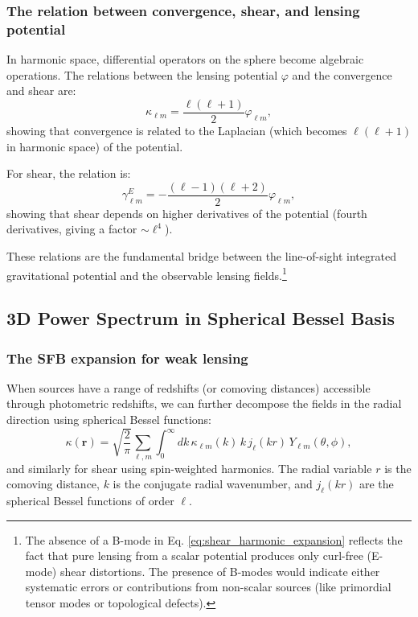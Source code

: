 \subsubsection{The relation between convergence, shear, and lensing potential}

In harmonic space, differential operators on the sphere become algebraic operations. The relations between the lensing potential
$\varphi$ and the convergence and shear are:
\begin{equation}
\kappa_{\ell m} = \frac{\ell(\ell+1)}{2} \varphi_{\ell m},
\label{eq:convergence_potential_relation}
\end{equation}
showing that convergence is related to the Laplacian (which becomes $\ell(\ell+1)$ in harmonic space) of the potential.

For shear, the relation is:
\begin{equation}
\gamma^E_{\ell m} = -\frac{(\ell-1)(\ell+2)}{2} \varphi_{\ell m},
\label{eq:shear_potential_relation}
\end{equation}
showing that shear depends on higher derivatives of the potential (fourth derivatives, giving a factor $\sim \ell^4$).

These relations are the fundamental bridge between the line-of-sight integrated gravitational potential and the observable
lensing fields.\footnote{The absence of a B-mode in Eq. \ref{eq:shear_harmonic_expansion} reflects the fact that pure lensing
from a scalar potential produces only curl-free (E-mode) shear distortions. The presence of B-modes would indicate either
systematic errors or contributions from non-scalar sources (like primordial tensor modes or topological defects).}

\subsection{3D Power Spectrum in Spherical Bessel Basis}

\subsubsection{The SFB expansion for weak lensing}

When sources have a range of redshifts (or comoving distances) accessible through photometric redshifts, we can further decompose
the fields in the radial direction using spherical Bessel functions:
\begin{equation}
\kappa(\mathbf{r}) = \sqrt{\frac{2}{\pi}} \sum_{\ell,m} \int_0^\infty dk \, \kappa_{\ell m}(k) \, k \, j_\ell(kr) \, Y_{\ell m}(\theta, \phi),
\label{eq:convergence_sfb_expansion}
\end{equation}
and similarly for shear using spin-weighted harmonics. The radial variable $r$ is the comoving distance, $k$ is the conjugate
radial wavenumber, and $j_\ell(kr)$ are the spherical Bessel functions of order $\ell$.


